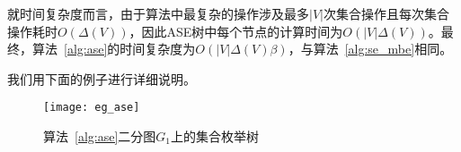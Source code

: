 就时间复杂度而言，由于算法中最复杂的操作涉及最多$|V|$次集合操作且每次集合操作耗时$O(\Delta(V))$，因此ASE树中每个节点的计算时间为$O(|V|\Delta(V))$。最终，算法~\ref{alg:ase}的时间复杂度为$O(|V|\Delta(V)\beta)$，与算法~\ref{alg:se_mbe}相同。

我们用下面的例子进行详细说明。

\begin{figure} [ht]
  \centering
  \texttt{[image: eg\_ase]}
  \caption{算法~\ref{alg:ase}二分图$G_1$上的集合枚举树}
  \label{fig:ase}
\end{figure}

\begin{example}
  \label{example:ase}

  


\end{example}
